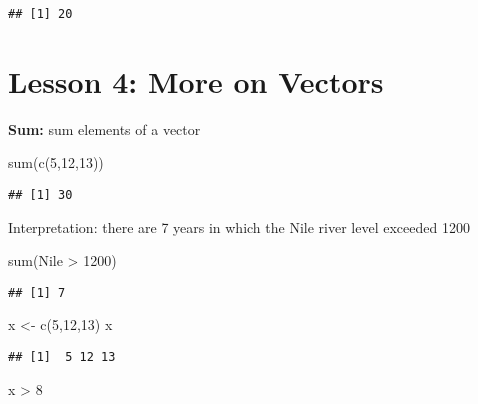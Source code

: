 \documentclass[
]{article}
\newenvironment{Shaded}{\begin{snugshade}}{\end{snugshade}}
\newcommand{\DecValTok}[1]{\textcolor[rgb]{0.00,0.00,0.81}{#1}}
\newcommand{\FunctionTok}[1]{\textcolor[rgb]{0.00,0.00,0.00}{#1}}
\newcommand{\NormalTok}[1]{#1}
\newcommand{\OtherTok}[1]{\textcolor[rgb]{0.56,0.35,0.01}{#1}}
\newcommand{\SpecialCharTok}[1]{\textcolor[rgb]{0.00,0.00,0.00}{#1}}
\begin{document}
\begin{verbatim}
## [1] 20
\end{verbatim}

\hypertarget{lesson-4-more-on-vectors}{%
\section{Lesson 4: More on Vectors}\label{lesson-4-more-on-vectors}}

\textbf{Sum:} sum elements of a vector

\begin{Shaded}
\begin{Highlighting}[]
\FunctionTok{sum}\NormalTok{(}\FunctionTok{c}\NormalTok{(}\DecValTok{5}\NormalTok{,}\DecValTok{12}\NormalTok{,}\DecValTok{13}\NormalTok{))}
\end{Highlighting}
\end{Shaded}

\begin{verbatim}
## [1] 30
\end{verbatim}

Interpretation: there are 7 years in which the Nile river level exceeded
1200

\begin{Shaded}
\begin{Highlighting}[]
\FunctionTok{sum}\NormalTok{(Nile }\SpecialCharTok{\textgreater{}} \DecValTok{1200}\NormalTok{)}
\end{Highlighting}
\end{Shaded}

\begin{verbatim}
## [1] 7
\end{verbatim}

\begin{Shaded}
\begin{Highlighting}[]
\NormalTok{x }\OtherTok{\textless{}{-}} \FunctionTok{c}\NormalTok{(}\DecValTok{5}\NormalTok{,}\DecValTok{12}\NormalTok{,}\DecValTok{13}\NormalTok{)}
\NormalTok{x}
\end{Highlighting}
\end{Shaded}

\begin{verbatim}
## [1]  5 12 13
\end{verbatim}

\begin{Shaded}
\begin{Highlighting}[]
\NormalTok{x }\SpecialCharTok{\textgreater{}} \DecValTok{8}
\end{Highlighting}
\end{Shaded}
\end{document}
